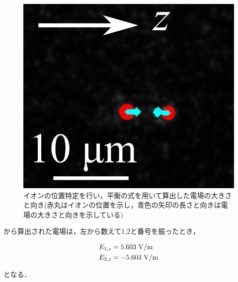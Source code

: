 \begin{figure}[h]
	\begin{center}
		\includegraphics[scale=0.5]{./methods/figure/out_image.png}
		\caption{イオンの位置特定を行い，平衡の式を用いて算出した電場の大きさと向き(赤丸はイオンの位置を示し，青色の矢印の長さと向きは電場の大きさと向きを示している)}
		\label{fig:out_image}
	\end{center}
\end{figure}

から算出された電場は，左から数えて1,2と番号を振ったとき，

\begin{align*}
	E_{1,z} &= 5.603 \ {\rm V/m} \\
	E_{2,z} &= -5.603 \ {\rm V/m} 
\end{align*}

となる．